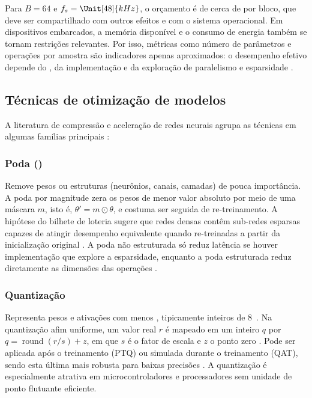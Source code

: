 \documentclass[%
  a4paper,%
  12pt,%
  fleqn,%
  english,%
  brazilian,%
]{article}
\begin{document}
Para $B = 64$ e $f_s = \Unit[48]{kHz}$, o orçamento é de cerca de  por bloco, que deve ser compartilhado com outros efeitos e com o sistema operacional.
Em dispositivos embarcados, a memória disponível e o consumo de energia também se tornam restrições relevantes.
Por isso, métricas como número de parâmetros e operações por amostra são indicadores apenas aproximados: o desempenho efetivo depende do , da implementação e da exploração de paralelismo e esparsidade \cite{Blalock2020}.

\subsection{Técnicas de otimização de modelos}%
\label{ssect:otim}

A literatura de compressão e aceleração de redes neurais agrupa as técnicas em algumas famílias principais \cite{Cheng2018}:

\subsubsection{Poda (\texorpdfstring{}{pruning})}
Remove pesos ou estruturas (neurônios, canais, camadas) de pouca importância.
A poda por magnitude zera os pesos de menor valor absoluto por meio de uma máscara $m$, isto é, $\theta' = m \odot \theta$, e costuma ser seguida de re-treinamento.
A hipótese do bilhete de loteria sugere que redes densas contêm sub-redes esparsas capazes de atingir desempenho equivalente quando re-treinadas a partir da inicialização original \cite{Frankle2019}.
A poda não estruturada só reduz latência se houver implementação que explore a esparsidade, enquanto a poda estruturada reduz diretamente as dimensões das operações \cite{Blalock2020}.

\subsubsection{Quantização}
Representa pesos e ativações com menos , tipicamente inteiros de 8~.
Na quantização afim uniforme, um valor real $r$ é mapeado em um inteiro $q$ por $q = \operatorname{round}(r/s) + z$, em que $s$ é o fator de escala e $z$ o ponto zero \cite{Jacob2018}.
Pode ser aplicada após o treinamento (PTQ) ou simulada durante o treinamento (QAT), sendo esta última mais robusta para baixas precisões \cite{Gholami2021}.
A quantização é especialmente atrativa em microcontroladores e processadores sem unidade de ponto flutuante eficiente.
\end{document}
